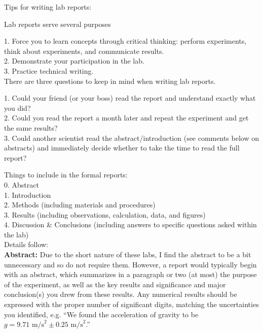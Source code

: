 \documentclass[11pt,letterpaper]{article}
\begin{document}
Tips for writing lab reports:

Lab reports serve several purposes

1. Force you to learn concepts through critical thinking: perform experiments, think about experiments, and communicate results. \\
2. Demonstrate your participation in the lab.\\
3. Practice technical writing.\\

There are three questions to keep in mind when writing lab reports.

1. Could your friend (or your boss) read the report and understand exactly what you did?\\
2. Could you read the report a month later and repeat the experiment and get the same results?\\
3. Could another scientist read the abstract/introduction (see comments below on abstracts) and immediately decide whether to take the time to read the full report?



Things to include in the formal reports:\\
0. Abstract\\
1. Introduction\\
2. Methods (including materials and procedures)\\
3. Results (including observations, calculation, data, and figures)\\
4. Discussion \& Conclusions (including answers to specific questions asked within the lab)\\
   
Details follow:\\

\textbf{Abstract:} Due to the short nature of these labs, I find the abstract to be a bit unnecessary and so do not require them. However, a report would typically begin with an abstract, which summarizes in a paragraph or two (at most) the purpose of the experiment, as well as the key results and significance and major conclusion(s) you drew from these results.  Any numerical results should be expressed with the proper number of significant digits, matching the uncertainties you identified, e.g. ``We found the acceleration of gravity to be $g=9.71\mbox{ m/s}^2 \pm 0.25\mbox{ m/s}^2$.''\\
\end{document}

